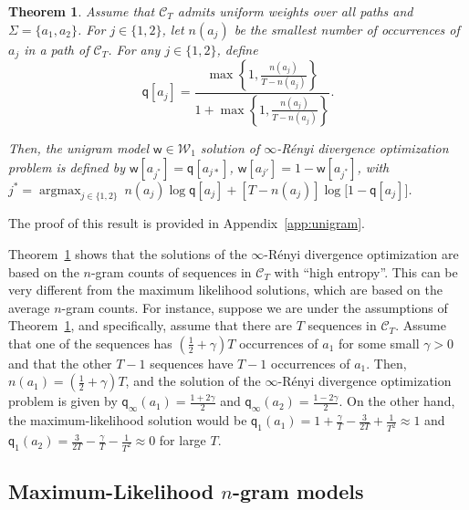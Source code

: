 \documentclass{article}
\DeclareMathOperator*{\argmax}{argmax}
\newcommand{\sC}{\mathscr C}
\newcommand{\sfq}{{\mathsf q}}
\newcommand{\sfw}{{\mathsf w}}
\newcommand{\cW}{\mathcal W}
\newcommand{\set}[2][]{#1 \{ #2 #1 \} }
\newtheorem{theorem}{Theorem}
\begin{document}
\begin{theorem}
\label{th:inftyrd1gram}
Assume that $\sC_T$ admits uniform weights over all paths and
$\Sigma = \set{a_1, a_2}$.  For $j \in \set{1, 2}$, let $n(a_j)$ be the smallest
number of occurrences of $a_j$ in a path of $\sC_T$.  For any $j \in
\set{1, 2}$, define
\begin{equation*}
\sfq[a_j] = \frac{\max\left\{1, \frac{n(a_j)}{T -
      n(a_j)}\right\}}{1+\max\left\{1, \frac{n(a_j)}{T -
      n(a_j)}\right\}}.
\end{equation*}

Then, the unigram model $\sfw \in \cW_1$ solution of
$\infty$-R\'{e}nyi divergence optimization problem is defined by
$\sfw[a_{j^*}] = \sfq[a_{j*}]$, $\sfw[a_{j'}] = 1 - \sfw[a_{j^*}]$,
with
$j^* = \argmax_{j \in \set{1, 2}} \ n(a_j) \log \sfq[a_j] + \left[T -
  n(a_j) \right] \log\big[ 1 - \sfq[a_j] \big]$.
\end{theorem}

The proof of this result is provided in Appendix~\ref{app:unigram}.

Theorem~\ref{th:inftyrd1gram} shows that the solutions of the
$\infty$-R\'enyi divergence optimization are based on the $n$-gram
counts of sequences in $\sC_T$ with ``high entropy''. This can be
very different from the maximum likelihood solutions, which are based
on the average $n$-gram counts.  For instance, suppose we are under
the assumptions of Theorem~\ref{th:inftyrd1gram}, and specifically,
assume that there are $T$ sequences in $\sC_T$. Assume that one of
the sequences has $\left(\frac{1}{2} + \gamma\right)T$ occurrences of
$a_1$ for some small $\gamma > 0$ and that the other $T-1$ sequences
have $T-1$ occurrences of $a_1$. Then,
$n(a_1) = \left(\frac{1}{2} + \gamma\right)T$, and the solution
of the $\infty$-R\'enyi divergence optimization problem is given by
$\sfq_\infty(a_1) = \frac{1 + 2\gamma}{2}$ and
$\sfq_\infty(a_2) = \frac{1 - 2\gamma}{2}$. On the other hand,
the maximum-likelihood solution would be
$\sfq_1(a_1) = 1 + \frac{\gamma}{T} - \frac{3}{2T} + \frac{1}{T^2} \approx 1$
and $\sfq_1(a_2) = \frac{3}{2T} - \frac{\gamma}{T} - \frac{1}{T^2} \approx 0$
for large $T$.




\subsection{Maximum-Likelihood $n$-gram models}
\label{subsec:mlapprox}
\end{document}
